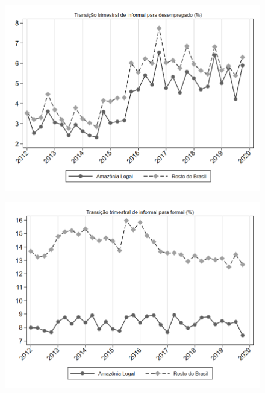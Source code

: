 \begin{frame}[label=_transicao_ocupacao_sh_informal_sh_desempregado]{}
\textit{\hyperlink{_transicao_ocupacao}{}}
\begin{figure}
  \centering
  \includegraphics[width=1.0\linewidth]{../../analysis/output/transicao_ocupacao/_transicao_ocupacao_sh_informal_sh_desempregado.png}
  \caption{}
  \label{fig:_transicao_ocupacao_sh_informal_sh_desempregado}
\end{figure}
\end{frame}



\begin{frame}[label=_transicao_ocupacao_sh_informal_sh_formal]{}
\textit{\hyperlink{_transicao_ocupacao}{}}
\begin{figure}
  \centering
  \includegraphics[width=1.0\linewidth]{../../analysis/output/transicao_ocupacao/_transicao_ocupacao_sh_informal_sh_formal.png}
  \caption{}
  \label{fig:_transicao_ocupacao_sh_informal_sh_formal}
\end{figure}
\end{frame}

